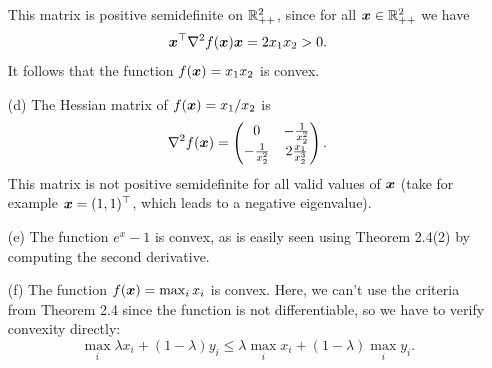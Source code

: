 \documentclass{article}
\begin{document}
\begin{itemize}
This matrix is positive semidefinite on $\mathbb{R}^2_{++}$, since for all $\bm{x}\in \mathbb{R}^2_{++}$ we have
\begin{equation*}
 \bm{x}^{\top}\nabla^2f(\bm{x})\bm{x} = 2x_1x_2>0.
\end{equation*}
It follows that the function $f(\bm{x})=x_1x_2$ is convex.
\item[(d)] The Hessian matrix of $f(\bm{x})=x_1/x_2$ is 
\begin{equation*}
 \nabla^2f(\bm{x}) = \begin{pmatrix}
                       0 & -\frac{1}{x_2^2}\\
                       -\frac{1}{x_2^2} & 2\frac{x_1}{x_2^3}
                      \end{pmatrix}.
\end{equation*}
This matrix is not positive semidefinite for all valid values of $\bm{x}$ (take for example $\bm{x}=(1,1)^{\top}$, which leads to a negative eigenvalue).
\item[(e)] The function $e^x-1$ is convex, as is easily seen using Theorem 2.4(2) by computing the second derivative.
\item[(f)] The function $f(\bm{x})=\max_i x_i$ is convex. Here, we can't use the criteria from Theorem 2.4 since the function is not differentiable, so we have to verify convexity directly:
\begin{equation*}
 \max_i \lambda x_i+(1-\lambda)y_i \leq \lambda \max_i x_i+(1-\lambda) \max_i y_i.
\end{equation*}
 \end{itemize}
\end{document}
